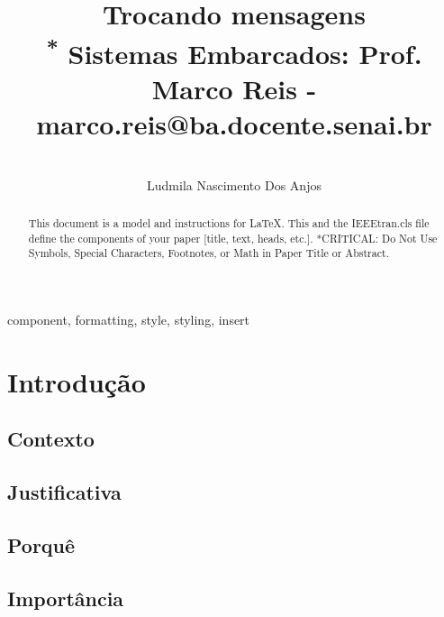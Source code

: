 \documentclass[conference]{IEEEtran}
\begin{document}
\title{Trocando mensagens\\
{\footnotesize \textsuperscript{*} Sistemas Embarcados: Prof. Marco Reis - marco.reis@ba.docente.senai.br}
}


\author{
    \IEEEauthorblockN\centerline{}{Ludmila Nascimento Dos Anjos}
    \and
}
\maketitle

\begin{abstract}
    This document is a model and instructions for \LaTeX.
    This and the IEEEtran.cls file define the components of your paper [title, text, heads, etc.]. *CRITICAL: Do Not Use Symbols, Special Characters, Footnotes,
    or Math in Paper Title or Abstract.
\end{abstract}

\begin{IEEEkeywords}
    component, formatting, style, styling, insert
\end{IEEEkeywords}

\section{Introdução}

\subsection{Contexto}

\subsection{Justificativa}

\subsection{Porquê}

\subsection{Importância}
\end{document}
